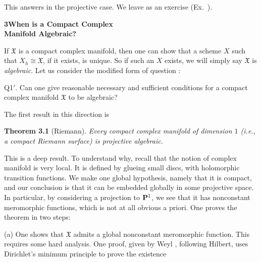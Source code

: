 {\medskip
This answers  in the projective case. We leave  as an exercise (Ex.~).

\bigskip
\noindent\hypertarget{sec-B-3}{}{\large\bfseries 3\quad When is a Compact Complex\\\hspace*{17pt}Manifold Algebraic?}\par
\medskip
\noindent If $\mathfrak X$ is a compact complex manifold, then one can show that a scheme $X$ such that $X_h\cong\mathfrak X$, if it exists, is unique. So if such an $X$ exists, we will simply say $\mathfrak X$ is \emph{algebraic}. Let us consider the modified form of question :

\smallskip
\hypertarget{question-B-Q1prime}{}Q1$'$. Can one give reasonable necessary and sufficient conditions for a compact complex manifold $\mathfrak X$ to be algebraic?

\smallskip
The first result in this direction is

\medskip
\noindent\hypertarget{result-B-3.1}{}\textbf{Theorem 3.1} (Riemann). \emph{Every compact complex manifold of dimension $1$ (i.e., a compact Riemann surface) is projective algebraic.}

\medskip
This is a deep result. To understand why, recall that the notion of complex manifold is very local. It is defined by glueing small discs, with holomorphic transition functions. We make one global hypothesis, namely that it is compact, and our conclusion is that it can be embedded globally in some projective space. In particular, by considering a projection to $\mathbf{P}^1$, we see that it has nonconstant meromorphic functions, which is not at all obvious a priori. One proves the theorem in two steps:

\hypertarget{result-B-3.1a}{}(a) One shows that $\mathfrak X$ admits a global nonconstant meromorphic function. This requires some hard analysis. One proof, given by Weyl , following Hilbert, uses Dirichlet's minimum principle to prove the existence
}
